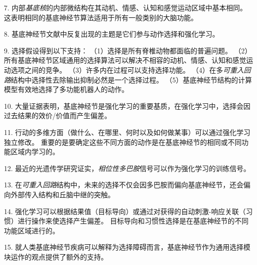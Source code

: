 7. 内部\textit{基底核}的内部微结构在其动机、情感、认知和感觉运动区域中基本相同。
这表明相同的基底神经节算法适用于所有一般类别的大脑功能。


8. 基底神经节文献中反复出现的主题是它们参与动作选择和强化学习。


9. 选择假设得到以下支持：
（1）选择是所有脊椎动物都面临的普遍问题。
（2）所有基底神经节区域通用的选择算法可以解决不相容的动机、情感、认知和感觉运动选项之间的竞争。
（3）许多内在过程可以支持选择功能。
（4）在多\textit{可重入回路}结构中选择性去除输出抑制必然是一个选择过程。
（5）基底神经节结构的计算模型有效地选择了多功能机器人的动作。 


10. 大量证据表明，基底神经节是强化学习的重要基质，在强化学习中，选择会因过去结果的效价/价值而产生偏差。


11. 行动的多维方面（做什么、在哪里、何时以及如何做某事）可以通过强化学习独立修改。
重要的是要确定这些不同方面的动作是在基底神经节的相同或不同功能区域内学习的。


12. 最近的光遗传学研究证实，\textit{相位性多巴胺}信号可以作为强化学习的训练信号。


13. 在\textit{可重入回路}结构中，未来的选择不仅会因多巴胺而偏向基底神经节，还会偏向外部传入结构和丘脑中继的突触。


14. 强化学习可以根据结果值（目标导向）或通过对获得的自动刺激-响应关联（习惯）进行操作来使选择产生偏差。
目标导向和习惯性选择是在基底神经节的不同功能区域进行的。


15. 就人类基底神经节疾病可以解释为选择障碍而言，基底神经节作为通用选择模块运作的观点提供了额外的支持。

